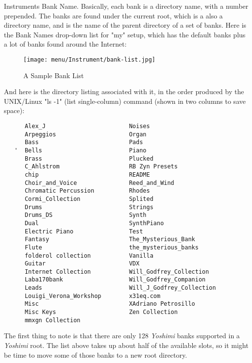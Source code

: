    \setcounter{ItemCounter}{0}      %

   Instruments Bank Name.
   Basically, each bank is a directory name, with a number prepended.
   The banks are found under the current root, which is a also a directory
   name, and is the name of the parent directory of a set of banks.
   Here is the Bank Names drop-down list for "my" setup, which has the
   default banks plus a lot of banks found around the Internet:

\begin{figure}[H]
   \centering 
   \texttt{[image: menu/Instrument/bank-list.jpg]}
   \caption[A Sample Bank List]{A Sample Bank List}
   \label{fig:bank_list}
\end{figure}

   And here is the directory listing associated with it, in the order
   produced by the UNIX/Linux "ls -1" (list single-column) command (shown in
   two columns to save space):

   \begin{verbatim}
      Alex_J                        Noises
      Arpeggios                     Organ
      Bass                          Pads
   '  Bells                         Piano
      Brass                         Plucked
      C_Ahlstrom                    RB Zyn Presets
      chip                          README
      Choir_and_Voice               Reed_and_Wind
      Chromatic Percussion          Rhodes
      Cormi_Collection              Splited
      Drums                         Strings
      Drums_DS                      Synth
      Dual                          SynthPiano
      Electric Piano                Test
      Fantasy                       The_Mysterious_Bank
      Flute                         the_mysterious_banks
      folderol collection           Vanilla
      Guitar                        VDX
      Internet Collection           Will_Godfrey_Collection
      Laba170bank                   Will_Godfrey_Companion
      Leads                         Will_J_Godfrey_Collection
      Louigi_Verona_Workshop        x31eq.com
      Misc                          XAdriano Petrosillo
      Misc Keys                     Zen Collection
      mmxgn Collection
   \end{verbatim}

   The first thing to note is that there are only 128 \textsl{Yoshimi} banks
   supported in a \textsl{Yoshimi} root.  The list above takes up about half
   of the available slots, so it might be time to move some of those banks
   to a new root directory.

